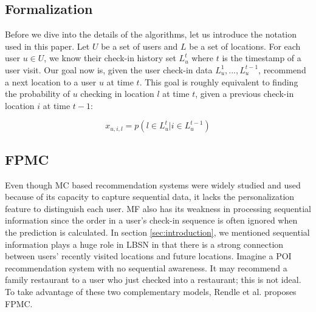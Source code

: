 \documentclass{sig-alternate}
\begin{document}
\subsection{Formalization}
\label{sec:typeChangesSpecialChars}

Before we dive into the details of the algorithms, let us introduce the notation used in this paper. 
Let $U$ be a set of users and $L$ be a set of locations. For each user $u \in U$, 
we know their check-in history set \begin{math}L^t_u\end{math} where $t$ is the timestamp 
of a user visit. Our goal now is, given the user check-in data 
\begin{math}L^1_u,...,L^{t-1}_u\end{math}, recommend a next location to 
a user $u$ at time $t$. This goal is roughly equivalent to finding the probability of $u$ 
checking in location $l$ at time $t$, given a previous check-in location $i$ at time $t-1$:

\begin{equation}
	x_{u,i,l}=p(l \in L_u^t | i \in L_u^{t-1})
\label{eq:goal}
\end{equation}

\subsection{FPMC}
\label{sec:typeChangesSpecialChars}

Even though MC based recommendation systems were widely studied and used because of 
its capacity to capture sequential data, it lacks the personalization feature to distinguish each user. 
MF also has its weakness in processing sequential information since the order in a user's check-in sequence 
is often ignored when the prediction is calculated.
In section \ref{sec:introduction}, we mentioned sequential information plays a huge role in LBSN 
in that there is a strong connection between users' recently visited locations and future locations. 
Imagine a POI recommendation system with no sequential awareness. 
It may recommend a family restaurant to a user who just checked into a restaurant; this is not ideal. 
To take advantage of these two complementary models, Rendle et al. \cite{Rendle:2010:FPM} proposes FPMC.
\end{document}

